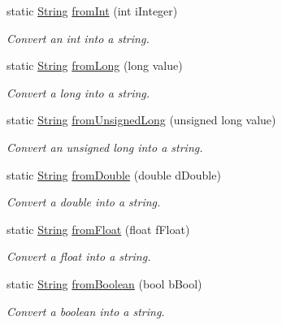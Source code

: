 \begin{DoxyCompactItemize}
\item 
static \hyperlink{class_rad_j_a_v_1_1_string}{String} \hyperlink{class_rad_j_a_v_1_1_string_a6062497071348a2d203341c2f650085d}{from\+Int} (int i\+Integer)
\begin{DoxyCompactList}\small\item\em Convert an int into a string. \end{DoxyCompactList}\item 
static \hyperlink{class_rad_j_a_v_1_1_string}{String} \hyperlink{class_rad_j_a_v_1_1_string_a037777a57b94a36a6f55cc88d5a1b647}{from\+Long} (long value)
\begin{DoxyCompactList}\small\item\em Convert a long into a string. \end{DoxyCompactList}\item 
static \hyperlink{class_rad_j_a_v_1_1_string}{String} \hyperlink{class_rad_j_a_v_1_1_string_a8dafc3ee64efa449f35add3f598f0281}{from\+Unsigned\+Long} (unsigned long value)
\begin{DoxyCompactList}\small\item\em Convert an unsigned long into a string. \end{DoxyCompactList}\item 
static \hyperlink{class_rad_j_a_v_1_1_string}{String} \hyperlink{class_rad_j_a_v_1_1_string_a5501161ff54528c58720c23a30397519}{from\+Double} (double d\+Double)
\begin{DoxyCompactList}\small\item\em Convert a double into a string. \end{DoxyCompactList}\item 
static \hyperlink{class_rad_j_a_v_1_1_string}{String} \hyperlink{class_rad_j_a_v_1_1_string_a2dd011b85984bd4c4199b5fa07b24c6a}{from\+Float} (float f\+Float)
\begin{DoxyCompactList}\small\item\em Convert a float into a string. \end{DoxyCompactList}\item 
static \hyperlink{class_rad_j_a_v_1_1_string}{String} \hyperlink{class_rad_j_a_v_1_1_string_a169239aca74c7cb7fcee2f80cf868f62}{from\+Boolean} (bool b\+Bool)
\begin{DoxyCompactList}\small\item\em Convert a boolean into a string. \end{DoxyCompactList}\end{DoxyCompactItemize}


